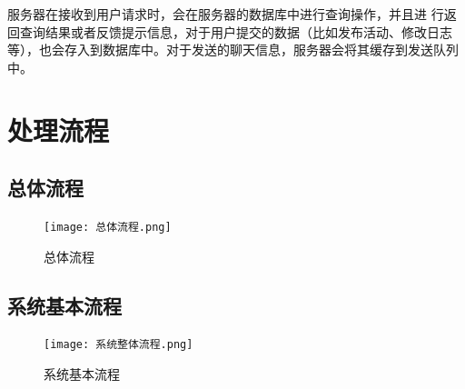 服务器在接收到用户请求时，会在服务器的数据库中进行查询操作，并且进
行返回查询结果或者反馈提示信息，对于用户提交的数据（比如发布活动、修改日志等），也会存入到数据库中。对于发送的聊天信息，服务器会将其缓存到发送队列中。

\section{处理流程}
    \subsection{总体流程}
        \begin{figure}[ht]
            \centering
            \texttt{[image: 总体流程.png]}\label{tab:classification}
            \caption{总体流程}\label{fig:noted-figure}
        \end{figure}
        \newpage
    \subsection{系统基本流程}
        \begin{figure}[ht]
            \centering
            \texttt{[image: 系统整体流程.png]}\label{tab:classification}
            \caption{系统基本流程}\label{fig:noted-figure}
        \end{figure}
        \newpage
